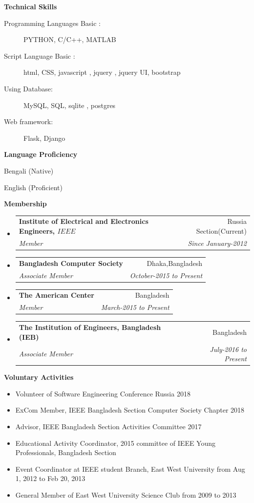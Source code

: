 \documentclass[letterpaper,10pt]{article}
\makeatletter
\newcommand{\resitem}[1]{\item #1 \vspace{-2pt}}
\newcommand{\resheading}[1]{{\large \colorbox{mygrey}{\begin{minipage}{\textwidth}{\textbf{#1 \vphantom{p\^{E}}}}\end{minipage}}}}
\newcommand{\ressubheading}[4]{
\begin{tabular*}{6.5in}{l@{\extracolsep{\fill}}r}
		\textbf{#1} & #2 \\
		\textit{#3} & \textit{#4} \\
\end{tabular*}\vspace{-6pt}}
\makeatother
\begin{document}
\begin{description}
\item
\resitem{\textbf{Technical Skills}}
\begin{description}
\item[Programming Languages Basic :] PYTHON, C/C++, MATLAB
\item[Script Language Basic :] html, CSS, javascript , jquery , jquery UI, bootstrap
\item[Using Database:] MySQL, SQL, sqlite , postgres 
\item[Web framework:] Flask, Django
\end{description}
\item
\resitem{\textbf{Language Proficiency}}
\begin{description}
\item{Bengali (Native)}
\item{English (Proficient)}
\end{description}
\end{description}

 \resheading{Membership}
 \begin{itemize}
 \item
 \ressubheading{Institute of Electrical and Electronics Engineers, \(IEEE\)}{Russia Section(Current)}{Member}{Since January-2012}


 \item
 \ressubheading{Bangladesh Computer Society}{Dhaka,Bangladesh }{Associate Member}{October-2015 to Present}
 \item
 \ressubheading{The American Center}{Bangladesh}{Member}{March-2015 to Present }
 \item
 \ressubheading{ The Institution of Engineers, Bangladesh (IEB)}{Bangladesh}{Associate Member}{July-2016 to Present }

 \end{itemize}

\resheading{Voluntary Activities}
\begin{itemize}
	\item{Volunteer of Software Engineering Conference Russia 2018 }
	\item{ExCom Member, IEEE Bangladesh Section Computer Society Chapter 2018 }
	\item {Advisor, IEEE Bangladesh Section Activities Committee 2017}
\item {Educational Activity Coordinator, 2015 committee of IEEE Young Professionals, Bangladesh Section}
    \item{Event Coordinator at IEEE student Branch, East West University from Aug 1, 2012 to Feb 20, 2013 }
    \item {General Member of East West University Science Club from 2009 to 2013}
\end{itemize}
\end{document}
